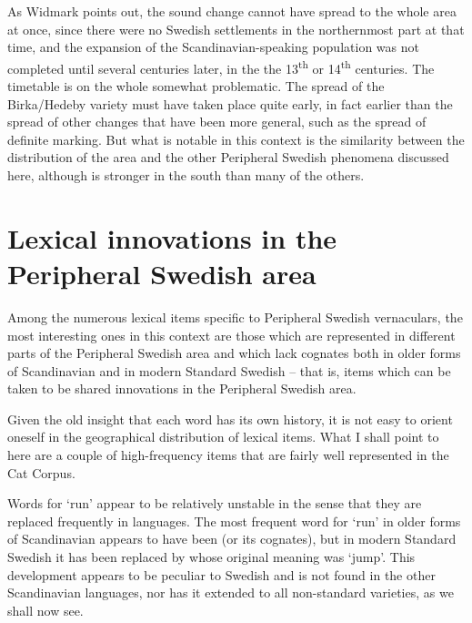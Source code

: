 As Widmark points out, the sound change  cannot have spread to the whole area at once, since there were no Swedish settlements in the northernmost part at that time, and the expansion of the Scandinavian-speaking population was not completed until several centuries later, in the the 13\textsuperscript{th} or 14\textsuperscript{th} centuries. The timetable is on the whole somewhat problematic. The spread of the Birka/Hedeby variety must have taken place quite early, in fact earlier than the spread of other changes that have been more general, such as the spread of definite marking. But what is notable in this context is the similarity between the distribution of the area and the other Peripheral Swedish phenomena discussed here, although  is stronger in the south than many of the others. 



\section{Lexical innovations in the Peripheral Swedish area}


Among the numerous lexical items specific to Peripheral Swedish vernaculars, the most interesting ones in this context are those which are represented in different parts of the Peripheral Swedish area and which lack cognates both in older forms of Scandinavian and in modern Standard Swedish – that is, items which can be taken to be shared innovations in the Peripheral Swedish area. 




Given the old insight that each word has its own history, it is not easy to orient oneself in the geographical distribution of lexical items. What I shall point to here are a couple of high-frequency items that are fairly well represented in the Cat Corpus.




Words for ‘run’ appear to be relatively unstable in the sense that they are replaced frequently in languages. The most frequent word for ‘run’ in older forms of Scandinavian appears to have been (or its cognates), but in modern Standard Swedish it has been replaced by whose original meaning was ‘jump’. This development appears to be peculiar to Swedish and is not found in the other Scandinavian languages, nor has it extended to all non-standard varieties, as we shall now see. 




